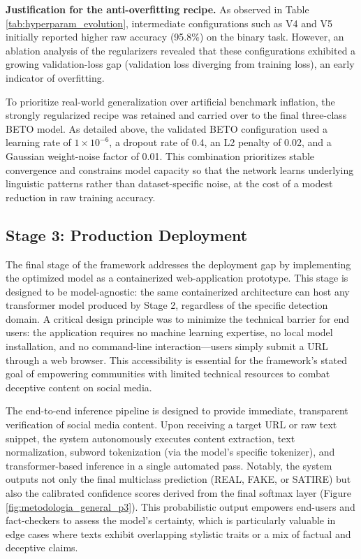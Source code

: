 \documentclass[informatics,article,submit,pdftex,moreauthors]{Definitions/mdpi}
\begin{document}
\textbf{Justification for the anti-overfitting recipe.} 
As observed in Table \ref{tab:hyperparam_evolution}, intermediate configurations such as V4 and V5 initially reported higher raw accuracy (95.8\%) on the binary task. However, an ablation analysis of the regularizers revealed that these configurations exhibited a growing validation-loss gap (validation loss diverging from training loss), an early indicator of overfitting. 

To prioritize real-world generalization over artificial benchmark inflation, the strongly regularized recipe was retained and carried over to the final three-class BETO model. As detailed above, the validated BETO configuration used a learning rate of $1 \times 10^{-6}$, a dropout rate of 0.4, an L2 penalty of 0.02, and a Gaussian weight-noise factor of 0.01. This combination prioritizes stable convergence and constrains model capacity so that the network learns underlying linguistic patterns rather than dataset-specific noise, at the cost of a modest reduction in raw training accuracy.

\subsection{Stage 3: Production Deployment}
The final stage of the framework addresses the deployment gap by implementing the optimized model as a containerized web-application prototype. This stage is designed to be model-agnostic: the same containerized architecture can host any transformer model produced by Stage 2, regardless of the specific detection domain. A critical design principle was to minimize the technical barrier for end users: the application requires no machine learning expertise, no local model installation, and no command-line interaction—users simply submit a URL through a web browser. This accessibility is essential for the framework's stated goal of empowering communities with limited technical resources to combat deceptive content on social media.

The end-to-end inference pipeline is designed to provide immediate, transparent verification of social media content. Upon receiving a target URL or raw text snippet, the system autonomously executes content extraction, text normalization, subword tokenization (via the model's specific tokenizer), and transformer-based inference in a single automated pass. Notably, the system outputs not only the final multiclass prediction (REAL, FAKE, or SATIRE) but also the calibrated confidence scores derived from the final softmax layer (Figure \ref{fig:metodologia_general_p3}). This probabilistic output empowers end-users and fact-checkers to assess the model's certainty, which is particularly valuable in edge cases where texts exhibit overlapping stylistic traits or a mix of factual and deceptive claims.
\end{document}
